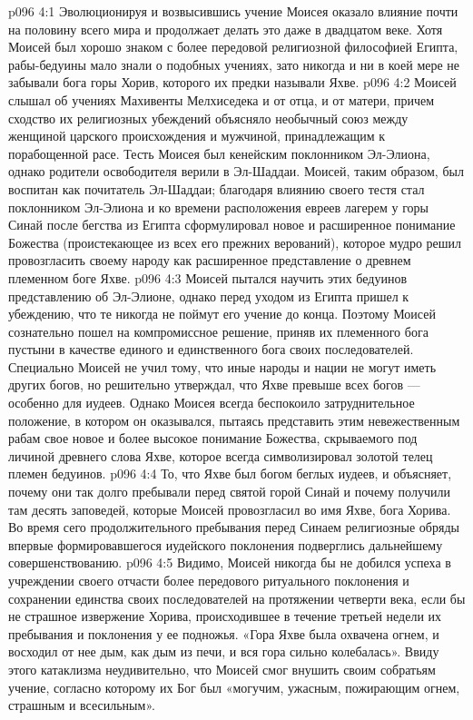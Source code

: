 \vs p096 4:1 Эволюционируя и возвысившись учение Моисея оказало влияние почти на половину всего мира и продолжает делать это даже в двадцатом веке. Хотя Моисей был хорошо знаком с более передовой религиозной философией Египта, рабы\hyp{}бедуины мало знали о подобных учениях, зато никогда и ни в коей мере не забывали бога горы Хорив, которого их предки называли Яхве.
\vs p096 4:2 Моисей слышал об учениях Махивенты Мелхиседека и от отца, и от матери, причем сходство их религиозных убеждений объясняло необычный союз между женщиной царского происхождения и мужчиной, принадлежащим к порабощенной расе. Тесть Моисея был кенейским поклонником Эл\hyp{}Элиона, однако родители освободителя верили в Эл\hyp{}Шаддаи. Моисей, таким образом, был воспитан как почитатель Эл\hyp{}Шаддаи; благодаря влиянию своего тестя стал поклонником Эл\hyp{}Элиона и ко времени расположения евреев лагерем у горы Синай после бегства из Египта сформулировал новое и расширенное понимание Божества (проистекающее из всех его прежних верований), которое мудро решил провозгласить своему народу как расширенное представление о древнем племенном боге Яхве.
\vs p096 4:3 Моисей пытался научить этих бедуинов представлению об Эл\hyp{}Элионе, однако перед уходом из Египта пришел к убеждению, что те никогда не поймут его учение до конца. Поэтому Моисей сознательно пошел на компромиссное решение, приняв их племенного бога пустыни в качестве единого и единственного бога своих последователей. Специально Моисей не учил тому, что иные народы и нации не могут иметь других богов, но решительно утверждал, что Яхве превыше всех богов --- особенно для иудеев. Однако Моисея всегда беспокоило затруднительное положение, в котором он оказывался, пытаясь представить этим невежественным рабам свое новое и более высокое понимание Божества, скрываемого под личиной древнего слова Яхве, которое всегда символизировал золотой телец племен бедуинов.
\vs p096 4:4 \pc То, что Яхве был богом беглых иудеев, и объясняет, почему они так долго пребывали перед святой горой Синай и почему получили там десять заповедей, которые Моисей провозгласил во имя Яхве, бога Хорива. Во время сего продолжительного пребывания перед Синаем религиозные обряды впервые формировавшегося иудейского поклонения подверглись дальнейшему совершенствованию.
\vs p096 4:5 \pc Видимо, Моисей никогда бы не добился успеха в учреждении своего отчасти более передового ритуального поклонения и сохранении единства своих последователей на протяжении четверти века, если бы не страшное извержение Хорива, происходившее в течение третьей недели их пребывания и поклонения у ее подножья. «Гора Яхве была охвачена огнем, и восходил от нее дым, как дым из печи, и вся гора сильно колебалась». Ввиду этого катаклизма неудивительно, что Моисей смог внушить своим собратьям учение, согласно которому их Бог был «могучим, ужасным, пожирающим огнем, страшным и всесильным».
